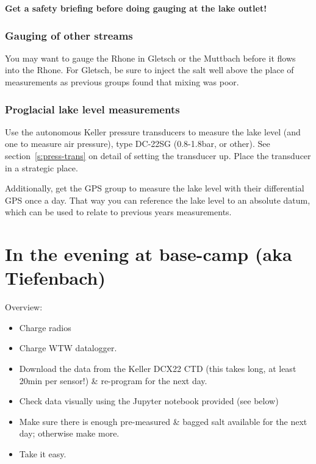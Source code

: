 \documentclass[DIV=15,halfparskip,11pt,headinclude]{scrartcl}
\begin{document}
{\bf Get a safety briefing before doing gauging at the lake outlet!}

\subsubsection{Gauging of other streams}

You may want to gauge the Rhone in Gletsch or the Muttbach before it
flows into the Rhone.  For Gletsch, be sure to inject the salt well
above the place of measurements as previous groups found that mixing
was poor.

\subsubsection{Proglacial lake level measurements}

Use the autonomous Keller pressure transducers to measure the lake
level (and one to measure air pressure), type DC-22SG (0.8-1.8bar, or other).
%
See section~\ref{s:press-trans} on detail of setting the transducer up.
Place the transducer in a strategic place.

Additionally, get the GPS group to measure the lake level with their
differential GPS once a day.  That way you can reference the lake
level to an absolute datum, which can be used to relate to previous
years measurements.

\section{In the evening at base-camp (aka Tiefenbach)}
\label{sec-evening}
Overview:
\begin{itemize}
\item Charge radios
\item Charge WTW datalogger.
\item Download the data from the Keller DCX22 CTD (this takes long,
    at least 20min per sensor!) \& re-program for the next day.
\item Check data visually using the Jupyter notebook provided (see below)
\item Make sure there is enough pre-measured \& bagged salt available
  for the next day; otherwise make more.
\item Take it easy.
\end{itemize}
\end{document}
